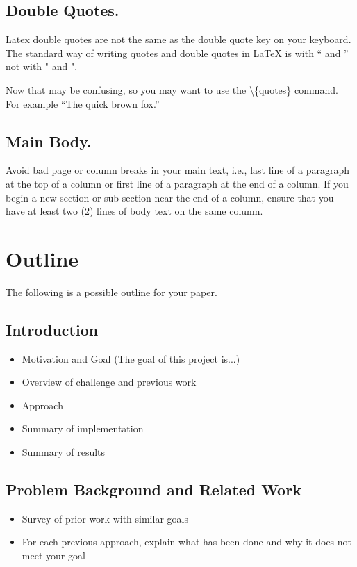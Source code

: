 \documentclass[pageno]{jpaper}
\newcommand{\quotes}[1]{``#1''}
\begin{document}
\subsection{Double Quotes.}

Latex double quotes are not the same as the double quote key on your
keyboard. The standard way of writing quotes and double quotes in
LaTeX is with `` and '' not with " and ".   

Now that may be confusing, so you may want to use the \textbackslash\{quotes\} command.  For
example \quotes{The quick brown fox.}



\subsection{Main Body.}

Avoid bad page or column breaks in
your main text, i.e., last line of a paragraph at the top of a
column or first line of a paragraph at the end of a column. If you
begin a new section or sub-section near the end of a column,
ensure that you have at least two (2)  lines of body text on the same
column. 

\section{Outline}  
The following is a possible outline for your paper.
\subsection{Introduction}
\begin{itemize}
\item Motivation and Goal (The goal of this project is...)
\item Overview of challenge and previous work 
\item Approach 
\item Summary of implementation
\item Summary of results
\end{itemize}

\subsection{Problem Background and Related Work}
\begin{itemize}
\item Survey of prior work with similar goals 
\item For each previous approach, explain what has been done and why it does not meet your goal
\end{itemize}
\end{document}
